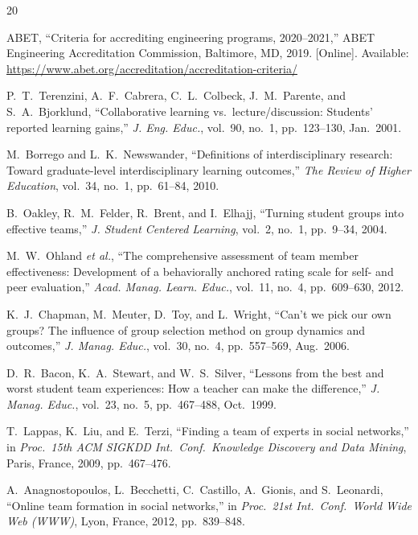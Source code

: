 \documentclass[conference]{IEEEtran}
\begin{document}
\balance
\begin{thebibliography}{20}

ABET, ``Criteria for accrediting engineering programs, 2020--2021,'' ABET Engineering Accreditation Commission, Baltimore, MD, 2019. [Online]. Available: \url{https://www.abet.org/accreditation/accreditation-criteria/}

P.~T.~Terenzini, A.~F.~Cabrera, C.~L.~Colbeck, J.~M.~Parente, and S.~A.~Bjorklund, ``Collaborative learning vs.\ lecture/discussion: Students' reported learning gains,'' \textit{J. Eng. Educ.}, vol.~90, no.~1, pp.~123--130, Jan.\ 2001.

M.~Borrego and L.~K.~Newswander, ``Definitions of interdisciplinary research: Toward graduate-level interdisciplinary learning outcomes,'' \textit{The Review of Higher Education}, vol.~34, no.~1, pp.~61--84, 2010.

B.~Oakley, R.~M.~Felder, R.~Brent, and I.~Elhajj, ``Turning student groups into effective teams,'' \textit{J. Student Centered Learning}, vol.~2, no.~1, pp.~9--34, 2004.

M.~W.~Ohland \textit{et al.}, ``The comprehensive assessment of team member effectiveness: Development of a behaviorally anchored rating scale for self- and peer evaluation,'' \textit{Acad. Manag. Learn. Educ.}, vol.~11, no.~4, pp.~609--630, 2012.

K.~J.~Chapman, M.~Meuter, D.~Toy, and L.~Wright, ``Can't we pick our own groups? The influence of group selection method on group dynamics and outcomes,'' \textit{J. Manag. Educ.}, vol.~30, no.~4, pp.~557--569, Aug.\ 2006.

D.~R.~Bacon, K.~A.~Stewart, and W.~S.~Silver, ``Lessons from the best and worst student team experiences: How a teacher can make the difference,'' \textit{J. Manag. Educ.}, vol.~23, no.~5, pp.~467--488, Oct.\ 1999.

T.~Lappas, K.~Liu, and E.~Terzi, ``Finding a team of experts in social networks,'' in \textit{Proc.\ 15th ACM SIGKDD Int.\ Conf.\ Knowledge Discovery and Data Mining}, Paris, France, 2009, pp.~467--476.

A.~Anagnostopoulos, L.~Becchetti, C.~Castillo, A.~Gionis, and S.~Leonardi, ``Online team formation in social networks,'' in \textit{Proc.\ 21st Int.\ Conf.\ World Wide Web (WWW)}, Lyon, France, 2012, pp.~839--848.


\end{thebibliography}
\end{document}
